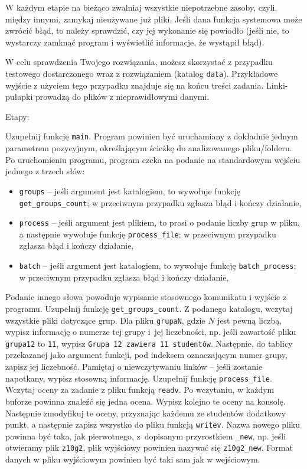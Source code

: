 \documentclass[addpoints,a4paper]{exam}
\begin{document}
W każdym etapie na bieżąco zwalniaj wszystkie niepotrzebne zasoby,
    czyli, między innymi, zamykaj nieużywane już pliki.
    Jeśli dana funkcja systemowa może zwrócić błąd,
    to należy sprawdzić,
    czy jej wykonanie się powiodło
    (jeśli nie, to wystarczy zamknąć program i wyświetlić informacje, że wystąpił błąd).

W celu sprawdzenia Twojego rozwiązania, możesz skorzystać z przypadku testowego dostarczonego wraz z rozwiązaniem (katalog \verb|data|). Przykładowe wyjście z użyciem tego przypadku znajduje się na końcu treści zadania. Linki-pułapki prowadzą do plików z nieprawidłowymi danymi.

\vskip10pt

Etapy:\nopagebreak[4]
\begin{questions} %
  \question[6] 
    Uzupełnij funkcję \verb|main|. Program powinien być uruchamiany z dokładnie    jednym parametrem pozycyjnym, określającym ścieżkę do analizowanego pliku/folderu. Po     uruchomieniu programu, program czeka na podanie na standardowym wejściu jednego z trzech słów: 
    \begin{itemize}
        \item \verb|groups| -- jeśli argument jest katalogiem, to wywołuje funkcję \verb|get_groups_count|; w przeciwnym przypadku zgłasza błąd i kończy działanie,
        \item \verb|process| -- jeśli argument jest plikiem, to prosi o podanie liczby grup w pliku, a następnie wywołuje funkcję \verb|process_file|; w przeciwnym przypadku zgłasza błąd i kończy działanie,
        \item \verb|batch| -- jeśli argument jest katalogiem, to wywołuje funkcję \verb|batch_process|; w przeciwnym przypadku zgłasza błąd i kończy działanie,
    \end{itemize}
    Podanie innego słowa powoduje wypisanie stosownego komunikatu i wyjście z programu.  
    \nopagebreak[4]
  \question[6] 
    Uzupełnij funkcję \verb|get_groups_count|. Z podanego katalogu, wczytaj wszystkie pliki dotyczące grup. Dla pliku \verb|grupaN|, gdzie $N$ jest pewną liczbą, wypisz informację o numerze tej grupy i~jej liczebności, np. jeśli zawartość pliku \verb|grupa12| to \verb|11|, wypisz \verb|Grupa 12 zawiera 11 studentów|. Następnie, do tablicy przekazanej jako argument funkcji, pod indeksem oznaczającym numer grupy, zapisz jej liczebność. Pamiętaj o niewczytywaniu linków -- jeśli zostanie napotkany, wypisz stosowną informację. 
    \nopagebreak[4]
  \question[7] 
    Uzupełnij funkcję \verb|process_file|. Wczytaj oceny za zadanie z pliku funkcją \verb|readv|. Po wczytaniu, w każdym buforze powinna znaleźć się jedna ocena. Wypisz kolejno te oceny na konsolę. Następnie zmodyfikuj te oceny, przyznając każdemu ze studentów dodatkowy punkt, a następnie zapisz wszystko do pliku funkcją \verb|writev|. Nazwa nowego pliku powinna być taka, jak pierwotnego, z~dopisanym przyrostkiem \verb|_new|, np. jeśli otwieramy plik \verb|z10g2|, plik wyjściowy powinien nazywać się \verb|z10g2_new|. Format danych w pliku wyjściowym powinien być taki sam jak w wejściowym.

\end{questions}
\end{document}
